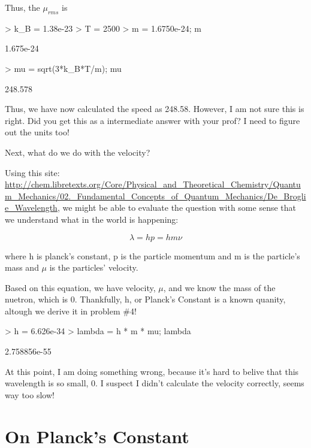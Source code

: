 \documentclass{article}
\begin{document}
Thus, the $\mu_{rms}$ is
\begin{Schunk}
\begin{Sinput}
> k_B = 1.38e-23
> T = 2500
> m = 1.6750e-24; m
\end{Sinput}
\begin{Soutput}
[1] 1.675e-24
\end{Soutput}
\begin{Sinput}
> mu = sqrt(3*k_B*T/m); mu
\end{Sinput}
\begin{Soutput}
[1] 248.578
\end{Soutput}
\end{Schunk}

Thus, we have now calculated the speed as 248.58. However, I am not sure this is right. Did you get this as a intermediate answer with your prof? I need to figure out the units too!

Next, what do we do with the velocity?  

Using this site: \url{http://chem.libretexts.org/Core/Physical_and_Theoretical_Chemistry/Quantum_Mechanics/02._Fundamental_Concepts_of_Quantum_Mechanics/De_Broglie_Wavelength}, we might be able to evaluate the question with some sense that we understand what in the world is happening:

\begin{equation}
\lambda = hp = h m \nu
\end{equation}

\noindent where h is planck's constant, p is the particle momentum and m is the particle's mass and $\mu$ is the particles' velocity. 

Based on this equation, we have velocity, $\mu$, and we know the mass of the nuetron, which is 0. Thankfully, h, or Planck's Constant is a known quanity, altough we derive it in problem \#4!

\begin{Schunk}
\begin{Sinput}
> h = 6.626e-34
> lambda = h * m * mu; lambda
\end{Sinput}
\begin{Soutput}
[1] 2.758856e-55
\end{Soutput}
\end{Schunk}

At this point, I am doing something wrong, because it's hard to belive that this wavelength is so small, 0. I suspect I didn't calculate the velocity correctly, seems way too slow!

\section{On Planck's Constant}
\end{document}
